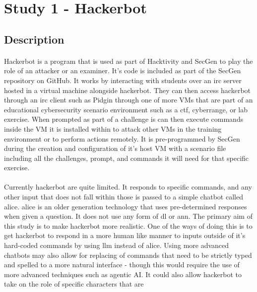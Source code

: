 \section{Study 1 - Hackerbot}
\subsection{Description}

\paragraph{}Hackerbot is a program that is used as part of Hacktivity and SecGen to play the role of an attacker or an examiner. It's code is included as part of the SecGen repository on GitHub. It works by interacting with students over an \acrfull{irc} server hosted in a virtual machine alongside hackerbot. They can then access hackerbot through an \acrshort{irc} client such as Pidgin through one of more \acrshort{VM}s that are part of an educational cybersecurity scenario environment such as a \acrshort{ctf}, cyberrange, or lab exercise. When prompted as part of a challenge is can then execute commands inside the \acrfull{VM} it is installed within to attack other \acrshort{VM}s in the training environment or to perform actions remotely. It is pre-programmed by SecGen during the creation and configuration of it's host \acrlong{VM} with a scenario file including all the challenges, prompt, and commands it will need for that specific exercise.

\paragraph{}Currently hackerbot are quite limited. It responds to specific commands, and any other input that does not fall within those is passed to a simple chatbot called \acrfull{alice}. \acrshort{alice} is an older generation technology that uses pre-determined responses when given a question. It does not use any form of \acrlong{dl} or \acrfull{ann}. The primary aim of this study is to make hackerbot more realistic. One of the ways of doing this is to get hackerbot to respond in a more human like manner to inputs outside of it's hard-coded commands by using \acrshort{llm} instead of \acrshort{alice}. Using more advanced chatbots may also allow for replacing of commands that need to be strictly typed and spelled to a more natural interface - though this would require the use of more advanced techniques such as agentic AI. It could also allow hackerbot to take on the role of specific characters that are 